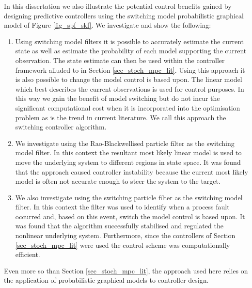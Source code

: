 In this dissertation we also illustrate the potential control benefits gained by designing predictive controllers using the switching model probabilistic graphical model of Figure \ref{fig_spf_skf}. We investigate and show the following:
\begin{enumerate}
\item
Using switching model filters it is possible to accurately estimate the current state as well as estimate the probability of each model supporting the current observation. The state estimate can then be used within the controller framework alluded to in Section \ref{sec_stoch_mpc_lit}. Using this approach it is also possible to change the model control is based upon. The linear model which best describes the current observations is used for control purposes. In this way we gain the benefit of model switching but do not incur the significant computational cost when it is incorporated into the optimisation problem as is the trend in current literature. We call this approach the switching controller algorithm.
\item
We investigate using the Rao-Blackwellised particle filter as the switching model filter. In this context the resultant most likely linear model is used to move the underlying system to different regions in state space. It was found that the approach caused controller instability because the current most likely model is often not accurate enough to steer the system to the target.
\item
We also investigate using the switching particle filter as the switching model filter. In this context the filter was used to identify when a process fault occurred and, based on this event, switch the model control is based upon. It was found that the algorithm successfully stabilised and regulated the nonlinear underlying system. Furthermore, since the controllers of Section \ref{sec_stoch_mpc_lit} were used the control scheme was computationally efficient.
\end{enumerate}
Even more so than Section \ref{sec_stoch_mpc_lit}, the approach used here relies on the application of probabilistic graphical models to controller design.  
